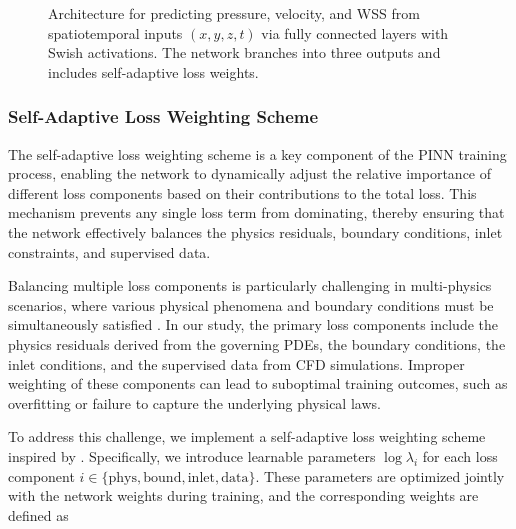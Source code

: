 \documentclass[12pt, a4paper]{article}
\begin{document}
\begin{figure}[htbp]
    \caption{Architecture for predicting pressure, velocity, and WSS from spatiotemporal inputs \((x,y,z,t)\) via fully connected layers with Swish activations. The network branches into three outputs and includes self-adaptive loss weights.}
    \label{fig:nn_architecture}
\end{figure}


\subsubsection{Self-Adaptive Loss Weighting Scheme}
\label{sec:self_adaptive_weighting}

The self-adaptive loss weighting scheme is a key component of the PINN training process, enabling the network to dynamically adjust the relative importance of different loss components based on their contributions to the total loss. This mechanism prevents any single loss term from dominating, thereby ensuring that the network effectively balances the physics residuals, boundary conditions, inlet constraints, and supervised data.

Balancing multiple loss components is particularly challenging in multi-physics scenarios, where various physical phenomena and boundary conditions must be simultaneously satisfied \citep{mcclenny2020self}. In our study, the primary loss components include the physics residuals derived from the governing PDEs, the boundary conditions, the inlet conditions, and the supervised data from CFD simulations. Improper weighting of these components can lead to suboptimal training outcomes, such as overfitting or failure to capture the underlying physical laws.

To address this challenge, we implement a self-adaptive loss weighting scheme inspired by \citet{mcclenny2020self}. Specifically, we introduce learnable parameters \(\log \lambda_i\) for each loss component \(i \in \{\mathrm{phys}, \mathrm{bound}, \mathrm{inlet}, \mathrm{data}\}\). These parameters are optimized jointly with the network weights during training, and the corresponding weights are defined as
\end{document}

